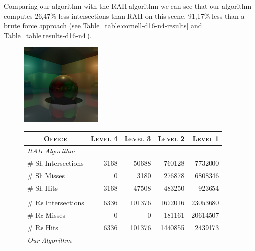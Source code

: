 
Comparing our algorithm with the RAH algorithm we can see that our algorithm computes 26,47\% less intersections than RAH on this scene. 91,17\% less than a brute force approach (see Table~\ref{table:cornell-d16-n4-results} and Table~\ref{table:results-d16-n4}).


\begin{figure}[!htb]
    \begin{minipage}{0.25\linewidth}
        \centering
        \includegraphics[width=4.0cm]{Images/Cornell_Preview}
    \end{minipage}
    \begin{minipage}{0.725\linewidth}
        \centering
        \fontsize{8}{10}
        \selectfont
        \begin{tabular}[h]{l|rrrr}
            \multicolumn{1}{c|}{\textsc{Office}} & \textsc{Level 4} & \textsc{Level 3} & \textsc{Level 2} & \textsc{Level 1}\\
            \hline
            \emph{RAH Algorithm} & & \\
            \hline
            \quad \# Sh Intersections   & 3168		& 50688		& 760128	& 7732000	\\
            \quad \# Sh Misses          & 0		    & 3180		& 276878	& 6808346	\\
            \quad \# Sh Hits            & 3168		& 47508		& 483250	& 923654	\\
            & & \\
            \quad \# Re Intersections   & 6336		& 101376	& 1622016	& 23053680	\\
            \quad \# Re Misses          & 0	        & 0	        & 181161	& 20614507	\\
            \quad \# Re Hits            & 6336		& 101376	& 1440855	& 2439173	\\
            \hline
            \emph{Our Algorithm} & & \\

\end{tabular}
\end{minipage}
\end{figure}
